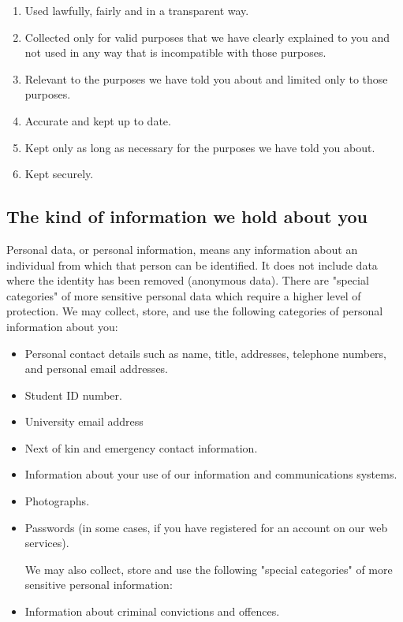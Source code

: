 \documentclass[12pt]{article}
\begin{document}
\begin{enumerate}
\item Used lawfully, fairly and in a transparent way.
\item Collected only for valid purposes that we have clearly explained to you and not used in any way that is incompatible with those purposes.
\item Relevant to the purposes we have told you about and limited only to those purposes.
\item Accurate and kept up to date.
\item Kept only as long as necessary for the purposes we have told you about.
\item Kept securely.
\end{enumerate}

\subsection{The kind of information we hold about you}
Personal data, or personal information, means any information about an individual from which that person can be identified. It does not include data where the identity has been removed (anonymous data).
There are "special categories" of more sensitive personal data which require a higher level of protection.
We may collect, store, and use the following categories of personal information about you:

\begin{itemize}
\item Personal contact details such as name, title, addresses, telephone numbers, and personal email addresses.
\item Student ID number.
\item University email address
\item Next of kin and emergency contact information.
\item Information about your use of our information and communications systems.
\item Photographs.
\item Passwords (in some cases, if you have registered for an account on our web services).

We may also collect, store and use the following "special categories" of more sensitive personal information:
\item Information about criminal convictions and offences.

\end{itemize}
\end{document}
